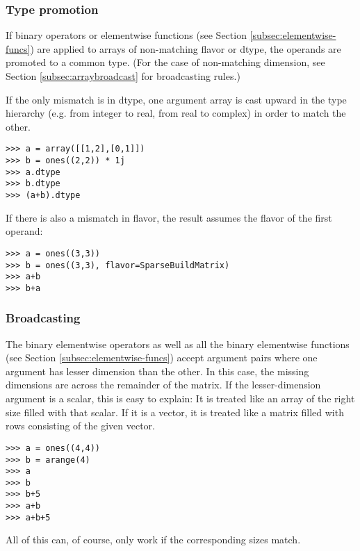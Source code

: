 \subsubsection{Type promotion}
\label{sssec:arraypromotion}
If binary operators or elementwise functions (see Section
\ref{subsec:elementwise-funcs}) are applied to arrays of non-matching flavor or
dtype, the operands are promoted to a common type. (For the case of
non-matching dimension, see Section \ref{subsec:arraybroadcast} for
broadcasting rules.)

If the only mismatch is in dtype, one argument array
is cast upward in the type hierarchy (e.g. from integer to real,
from real to complex) in order to match the other.

\begin{verbatim}
>>> a = array([[1,2],[0,1]])
>>> b = ones((2,2)) * 1j
>>> a.dtype
>>> b.dtype
>>> (a+b).dtype
\end{verbatim}

If there is also a mismatch in flavor, the result assumes the flavor
of the first operand:

\begin{verbatim}
>>> a = ones((3,3))
>>> b = ones((3,3), flavor=SparseBuildMatrix)
>>> a+b
>>> b+a
\end{verbatim}

\subsubsection{Broadcasting}
\label{sssec:arraybroadcast}
The binary elementwise operators as well as all the binary elementwise
functions (see Section \ref{subsec:elementwise-funcs}) accept argument pairs
where one argument has lesser dimension than the other. In this case, the
missing dimensions are  across the remainder
of the matrix. If the lesser-dimension argument is a scalar, this is easy to
explain: It is treated like an array of the right size filled with that scalar.
If it is a vector, it is treated like a matrix filled with rows consisting of
the given vector.
\begin{verbatim}
>>> a = ones((4,4))
>>> b = arange(4)
>>> a
>>> b
>>> b+5
>>> a+b
>>> a+b+5
\end{verbatim}
All of this can, of course, only work if the corresponding  sizes 
match.
